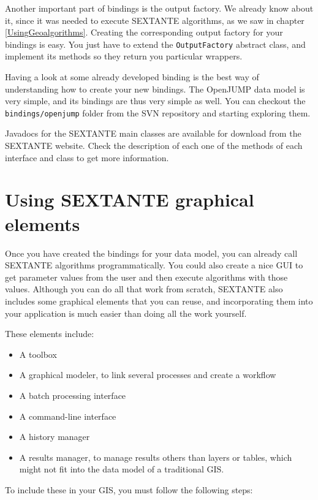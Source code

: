 Another important part of bindings is the output factory. We already know about it, since it was needed to execute SEXTANTE algorithms, as we saw in chapter \ref{UsingGeoalgorithms}. Creating the corresponding output factory for your bindings is easy. You just have to extend the \texttt{OutputFactory} abstract class, and implement its methods so they return you particular wrappers.

Having a look at some already developed binding is the best way of understanding how to create your new bindings. The OpenJUMP data model is very simple, and its bindings are thus very simple as well. You can checkout the \texttt{bindings/openjump} folder from the SVN repository and starting exploring them.

Javadocs for the SEXTANTE main classes are available for download from the SEXTANTE website. Check the description of each one of the methods of each interface and class to get more information.

\section{Using SEXTANTE graphical elements}

Once you have created the bindings for your data model, you can already call SEXTANTE algorithms programmatically. You could also create a nice GUI to get parameter values from the user and then execute algorithms with those values. Although you can do all that work from scratch, SEXTANTE also includes some graphical elements that you can reuse, and incorporating them into your application is much easier than doing all the work yourself.

These elements include:

\begin{itemize}
 \item A toolbox
 \item A graphical modeler, to link several processes and create a workflow
 \item A batch processing interface
 \item A command-line interface
 \item A history manager
 \item A results manager, to manage results others than layers or tables, which might not fit into the data model of a traditional GIS. 
\end{itemize}

To include these in your GIS, you must follow the following steps:

